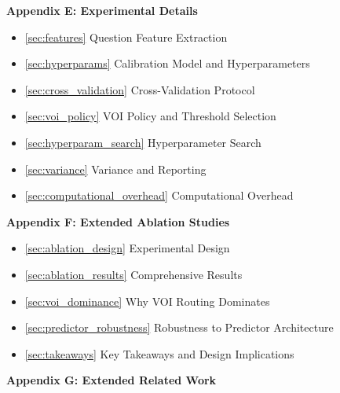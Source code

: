 \documentclass[11pt]{article}
\theoremstyle{plain}
\theoremstyle{definition}
\theoremstyle{remark}
\begin{document}
\vspace{0.5em}

\noindent\textbf{Appendix E: Experimental Details} \dotfill \pageref{sec:experimental}
\begin{itemize}[leftmargin=2em, label={}]
    \item \ref{sec:features} Question Feature Extraction \dotfill \pageref{sec:features}
    \item \ref{sec:hyperparams} Calibration Model and Hyperparameters \dotfill \pageref{sec:hyperparams}
    \item \ref{sec:cross_validation} Cross-Validation Protocol \dotfill \pageref{sec:cross_validation}
    \item \ref{sec:voi_policy} VOI Policy and Threshold Selection \dotfill \pageref{sec:voi_policy}
    \item \ref{sec:hyperparam_search} Hyperparameter Search \dotfill \pageref{sec:hyperparam_search}
    \item \ref{sec:variance} Variance and Reporting \dotfill \pageref{sec:variance}
    \item \ref{sec:computational_overhead} Computational Overhead \dotfill \pageref{sec:computational_overhead}
\end{itemize}

\vspace{0.5em}

\noindent\textbf{Appendix F: Extended Ablation Studies} \dotfill \pageref{sec:ablations}
\begin{itemize}[leftmargin=2em, label={}]
    \item \ref{sec:ablation_design} Experimental Design \dotfill \pageref{sec:ablation_design}
    \item \ref{sec:ablation_results} Comprehensive Results \dotfill \pageref{sec:ablation_results}
    \item \ref{sec:voi_dominance} Why VOI Routing Dominates \dotfill \pageref{sec:voi_dominance}
    \item \ref{sec:predictor_robustness} Robustness to Predictor Architecture \dotfill \pageref{sec:predictor_robustness}
    \item \ref{sec:takeaways} Key Takeaways and Design Implications \dotfill \pageref{sec:takeaways}
\end{itemize}

\vspace{0.5em}

\noindent\textbf{Appendix G: Extended Related Work} \dotfill \pageref{sec:related_ext}

\vspace{2em}
\clearpage














\end{document}
